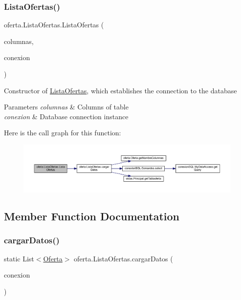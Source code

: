 \subsubsection{\texorpdfstring{Lista\+Ofertas()}{ListaOfertas()}}
{\footnotesize\ttfamily oferta.\+Lista\+Ofertas.\+Lista\+Ofertas (\begin{DoxyParamCaption}\item[{\mbox{\hyperlink{classoferta_1_1_modelo_columnas_tabla_oferta}{Modelo\+Columnas\+Tabla\+Oferta}}}]{columnas,  }\item[{\mbox{\hyperlink{classconexion_s_q_l_1_1_my_data_access}{My\+Data\+Access}}}]{conexion }\end{DoxyParamCaption})}

Constructor of \mbox{\hyperlink{classoferta_1_1_lista_ofertas}{Lista\+Ofertas}}, which establishes the connection to the database 
\begin{DoxyParams}{Parameters}
{\em columnas} & Columns of table \\
\hline
{\em conexion} & Database connection instance \\
\hline
\end{DoxyParams}
Here is the call graph for this function\+:
\nopagebreak
\begin{figure}[H]
\begin{center}
\leavevmode
\includegraphics[width=350pt]{classoferta_1_1_lista_ofertas_a2af761366b995c4ddf7cb6b1175de314_cgraph}
\end{center}
\end{figure}


\subsection{Member Function Documentation}
\mbox{\label{classoferta_1_1_lista_ofertas_a7ad03e98699edb0253f41109273e350e}} 
\subsubsection{\texorpdfstring{cargar\+Datos()}{cargarDatos()}}
{\footnotesize\ttfamily static List$<$\mbox{\hyperlink{classoferta_1_1_oferta}{Oferta}}$>$ oferta.\+Lista\+Ofertas.\+cargar\+Datos (\begin{DoxyParamCaption}\item[{\mbox{\hyperlink{classconexion_s_q_l_1_1_my_data_access}{My\+Data\+Access}}}]{conexion }\end{DoxyParamCaption})\hspace{0.3cm}{\ttfamily [static]}}

